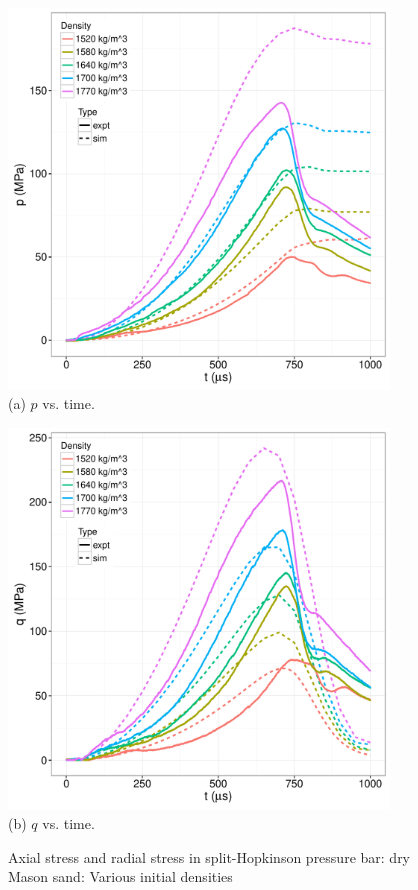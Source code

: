 \documentclass[11pt,a4paper]{article}
\begin{document}
\begin{appendices}
\begin{figure}[htbp!]
  \begin{minipage}{0.5\textwidth}
    \centering
    \includegraphics[width=0.9\textwidth]{FIGS/MasonSandSHPB_pt_sim_expt.pdf}\\
    (a) $p$ vs. time.
  \end{minipage}
  \begin{minipage}{0.5\textwidth}
    \centering
    \includegraphics[width=0.9\textwidth]{FIGS/MasonSandSHPB_qt_sim_expt.pdf}\\
    (b) $q$ vs. time.
  \end{minipage}
  \caption{Axial stress and radial stress in split-Hopkinson pressure bar: dry Mason sand: 
           Various initial densities}
  \label{fig:shpb_dry_pq_density}
\end{figure}


\end{appendices}
\end{document}
